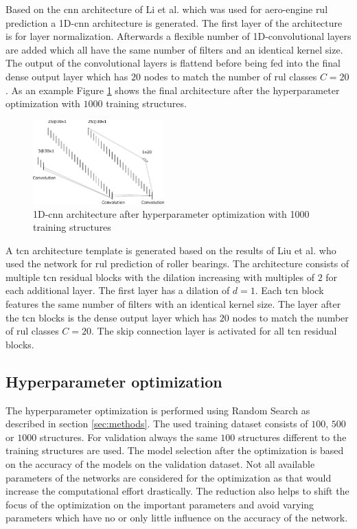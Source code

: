 \documentclass[conference]{IEEEtran}
\begin{document}
Based on the \gls{cnn} architecture of Li et al. \cite{Li2018} which was used for aero-engine \gls{rul} prediction a 1D-\gls{cnn} architecture is generated. The first layer of the architecture is for layer normalization. Afterwards a flexible number of 1D-convolutional layers are added which all have the same number of filters and an identical kernel size. The output of the convolutional layers is flattend before being fed into the final dense output layer which has $ 20 $ nodes to match the number of \gls{rul} classes $ C = 20 $. As an example Figure \ref{fig:cnn_architecture_1000_structures} shows the final architecture after the hyperparameter optimization with $ 1000 $ training structures.

\begin{figure}[htp]
	\centering
	\includegraphics[width=0.45\textwidth]{cnn_architecture_1000_structures.pdf}
	\caption{1D-\gls{cnn} architecture after hyperparameter optimization with 1000 training structures}
	\label{fig:cnn_architecture_1000_structures}
\end{figure}

A \gls{tcn} architecture template is generated based on the results of Liu et al. \cite{Liu2019} who used the network for \gls{rul} prediction of roller bearings. The architecture consists of multiple \gls{tcn} residual blocks with the dilation increasing with multiples of $ 2 $ for each additional layer. The first layer has a dilation of $ d = 1 $. Each \gls{tcn} block features the same number of filters with an identical kernel size. The layer after the \gls{tcn} blocks is the dense output layer which has $ 20 $ nodes to match the number of \gls{rul} classes $ C = 20 $. The skip connection layer is activated for all \gls{tcn} residual blocks.

\subsection{Hyperparameter optimization}
\label{sec:hyperparameter_optimization_results}

The hyperparameter optimization is performed using Random Search as described in section \ref{sec:methods}. The used training dataset consists of $ 100 $, $ 500 $ or $ 1000 $ structures. For validation always the same $ 100 $ structures different to the training structures are used. The model selection after the optimization is based on the accuracy of the models on the validation dataset. Not all available parameters of the networks are considered for the optimization as that would increase the computational effort drastically. The reduction also helps to shift the focus of the optimization on the important parameters and avoid varying parameters which have no or only little influence on the accuracy of the network.
\end{document}
